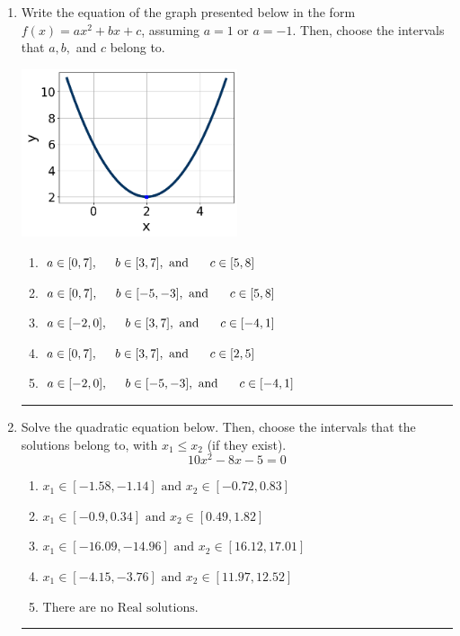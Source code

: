 \documentclass[14pt]{extbook}
\newcommand{\litem}[1]{\item#1\hspace*{-1cm}\rule{\textwidth}{0.4pt}}
\begin{document}
\begin{enumerate}
{\begin{enumerate}[label=\Alph*.]
\end{enumerate} }
\litem{
Write the equation of the graph presented below in the form $f(x)=ax^2+bx+c$, assuming  $a=1$ or $a=-1$. Then, choose the intervals that $a, b,$ and $c$ belong to.
\begin{center}
    \includegraphics[width=0.5\textwidth]{../Figures/quadraticGraphToEquationC.png}
\end{center}
\begin{enumerate}[label=\Alph*.]
\item \( a \in [0, 7], \hspace*{5mm} b \in [3, 7], \text{ and } \hspace*{5mm} c \in [5, 8] \)
\item \( a \in [0, 7], \hspace*{5mm} b \in [-5, -3], \text{ and } \hspace*{5mm} c \in [5, 8] \)
\item \( a \in [-2, 0], \hspace*{5mm} b \in [3, 7], \text{ and } \hspace*{5mm} c \in [-4, 1] \)
\item \( a \in [0, 7], \hspace*{5mm} b \in [3, 7], \text{ and } \hspace*{5mm} c \in [2, 5] \)
\item \( a \in [-2, 0], \hspace*{5mm} b \in [-5, -3], \text{ and } \hspace*{5mm} c \in [-4, 1] \)

\end{enumerate} }
\litem{
Solve the quadratic equation below. Then, choose the intervals that the solutions belong to, with $x_1 \leq x_2$ (if they exist).\[ 10x^{2} -8 x -5 = 0 \]\begin{enumerate}[label=\Alph*.]
\item \( x_1 \in [-1.58, -1.14] \text{ and } x_2 \in [-0.72, 0.83] \)
\item \( x_1 \in [-0.9, 0.34] \text{ and } x_2 \in [0.49, 1.82] \)
\item \( x_1 \in [-16.09, -14.96] \text{ and } x_2 \in [16.12, 17.01] \)
\item \( x_1 \in [-4.15, -3.76] \text{ and } x_2 \in [11.97, 12.52] \)
\item \( \text{There are no Real solutions.} \)


\end{enumerate}}
\end{enumerate}
\end{document}
